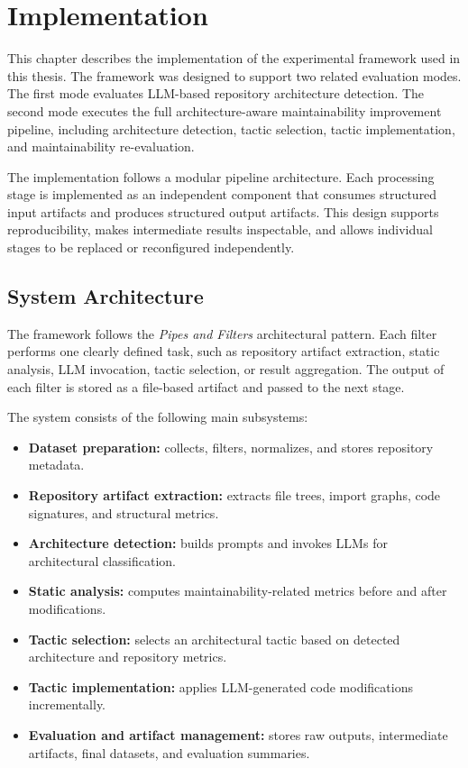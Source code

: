 \chapter{Implementation}
\label{chap:impl}

This chapter describes the implementation of the experimental framework used in this thesis. The framework was designed to support two related evaluation modes. The first mode evaluates LLM-based repository architecture detection. The second mode executes the full architecture-aware maintainability improvement pipeline, including architecture detection, tactic selection, tactic implementation, and maintainability re-evaluation.

The implementation follows a modular pipeline architecture. Each processing stage is implemented as an independent component that consumes structured input artifacts and produces structured output artifacts. This design supports reproducibility, makes intermediate results inspectable, and allows individual stages to be replaced or reconfigured independently.

\section{System Architecture}

The framework follows the \textit{Pipes and Filters} architectural pattern. Each filter performs one clearly defined task, such as repository artifact extraction, static analysis, LLM invocation, tactic selection, or result aggregation. The output of each filter is stored as a file-based artifact and passed to the next stage.

The system consists of the following main subsystems:

\begin{itemize}
    \item \textbf{Dataset preparation:} collects, filters, normalizes, and stores repository metadata.
    \item \textbf{Repository artifact extraction:} extracts file trees, import graphs, code signatures, and structural metrics.
    \item \textbf{Architecture detection:} builds prompts and invokes LLMs for architectural classification.
    \item \textbf{Static analysis:} computes maintainability-related metrics before and after modifications.
    \item \textbf{Tactic selection:} selects an architectural tactic based on detected architecture and repository metrics.
    \item \textbf{Tactic implementation:} applies LLM-generated code modifications incrementally.
    \item \textbf{Evaluation and artifact management:} stores raw outputs, intermediate artifacts, final datasets, and evaluation summaries.
\end{itemize}

